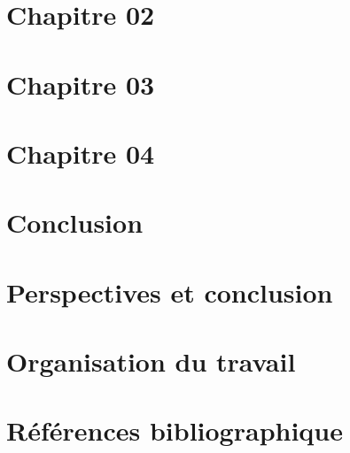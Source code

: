 \documentclass[a4paper,11pt]{report}
\begin{document}
\chapter{Chapitre 02}


\chapter{Chapitre 03}


\chapter{Chapitre 04}


\chapter*{Conclusion}



\chapter*{Perspectives et conclusion}




\chapter*{Organisation du travail}




\chapter*{Références bibliographique}
\end{document}
